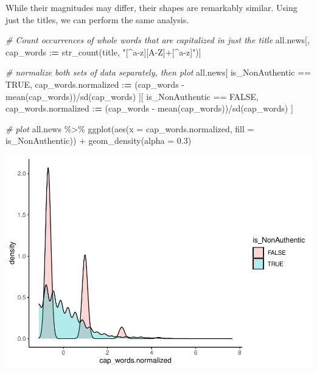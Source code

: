 \documentclass[
]{article}
\newenvironment{Shaded}{\begin{snugshade}}{\end{snugshade}}
\newcommand{\AttributeTok}[1]{\textcolor[rgb]{0.77,0.63,0.00}{#1}}
\newcommand{\CommentTok}[1]{\textcolor[rgb]{0.56,0.35,0.01}{\textit{#1}}}
\newcommand{\ConstantTok}[1]{\textcolor[rgb]{0.00,0.00,0.00}{#1}}
\newcommand{\ErrorTok}[1]{\textcolor[rgb]{0.64,0.00,0.00}{\textbf{#1}}}
\newcommand{\FloatTok}[1]{\textcolor[rgb]{0.00,0.00,0.81}{#1}}
\newcommand{\FunctionTok}[1]{\textcolor[rgb]{0.00,0.00,0.00}{#1}}
\newcommand{\NormalTok}[1]{#1}
\newcommand{\SpecialCharTok}[1]{\textcolor[rgb]{0.00,0.00,0.00}{#1}}
\newcommand{\StringTok}[1]{\textcolor[rgb]{0.31,0.60,0.02}{#1}}
\begin{document}
While their magnitudes may differ, their shapes are remarkably similar.
Using just the titles, we can perform the same analysis.

\begin{Shaded}
\begin{Highlighting}[]
\CommentTok{\# Count occurrences of whole words that are capitalized in just the title}
\NormalTok{all.news[, cap\_words }\SpecialCharTok{:}\ErrorTok{=} \FunctionTok{str\_count}\NormalTok{(title, }\StringTok{"[\^{}a{-}z][A{-}Z]+[\^{}a{-}z]"}\NormalTok{)]}

\CommentTok{\# normalize both sets of data separately, then plot}
\NormalTok{all.news[}
\NormalTok{  is\_NonAuthentic }\SpecialCharTok{==} \ConstantTok{TRUE}\NormalTok{,}
\NormalTok{  cap\_words.normalized }\SpecialCharTok{:}\ErrorTok{=}\NormalTok{ (cap\_words }\SpecialCharTok{{-}} \FunctionTok{mean}\NormalTok{(cap\_words))}\SpecialCharTok{/}\FunctionTok{sd}\NormalTok{(cap\_words)}
\NormalTok{][}
\NormalTok{  is\_NonAuthentic }\SpecialCharTok{==} \ConstantTok{FALSE}\NormalTok{,}
\NormalTok{  cap\_words.normalized }\SpecialCharTok{:}\ErrorTok{=}\NormalTok{ (cap\_words }\SpecialCharTok{{-}} \FunctionTok{mean}\NormalTok{(cap\_words))}\SpecialCharTok{/}\FunctionTok{sd}\NormalTok{(cap\_words)}
\NormalTok{]}

\CommentTok{\# plot}
\NormalTok{all.news }\SpecialCharTok{\%\textgreater{}\%}
  \FunctionTok{ggplot}\NormalTok{(}\FunctionTok{aes}\NormalTok{(}\AttributeTok{x =}\NormalTok{ cap\_words.normalized, }\AttributeTok{fill =}\NormalTok{ is\_NonAuthentic)) }\SpecialCharTok{+}
  \FunctionTok{geom\_density}\NormalTok{(}\AttributeTok{alpha =} \FloatTok{0.3}\NormalTok{)}
\end{Highlighting}
\end{Shaded}

\includegraphics{report_files/figure-latex/visualize_capitalized_word_counts_just_title-1.pdf}
\end{document}
